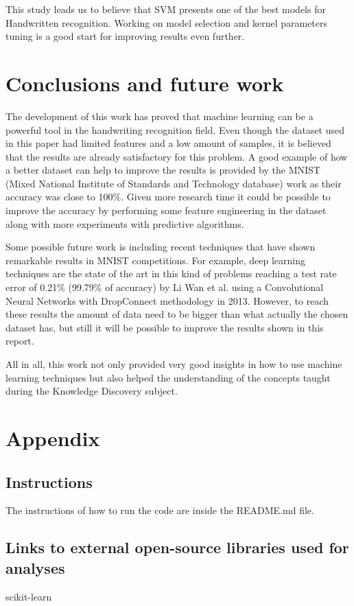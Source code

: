 \documentclass[letterpaper,10pt]{article}
\theoremstyle{mytheor}
\begin{document}
This study leads us to believe that SVM presents one of the best models for Handwritten recognition. Working on model selection and kernel parameters tuning is a good start for improving results even further.

\section{Conclusions and future work}

The development of this work has proved that machine learning can be a powerful tool in the handwriting recognition field. Even though the dataset used in this paper had limited features and a low amount of samples, it is believed that the results are already satisfactory for this problem. A good example of how a better dataset can help to improve the results is provided by the MNIST (Mixed National Institute of Standards and Technology database) work as their accuracy was close to 100\%. Given more research time it could be possible to improve the accuracy by performing some feature engineering in the dataset along with more experiments with predictive algorithms. 

Some possible future work is including recent techniques that have shown remarkable results in MNIST competitions. For example, deep learning techniques are the state of the art in this kind of problems reaching a test rate error of 0.21\% (99.79\% of accuracy) by Li Wan et al. using a Convolutional Neural Networks with DropConnect methodology in 2013. However, to reach these results the amount of data need to be bigger than what actually the chosen dataset has, but still it will be possible to improve the results shown in this report.

All in all, this work not only provided very good insights in how to use machine learning techniques but also helped the understanding of the concepts taught during the Knowledge Discovery subject.


\nocite{wiki:fscore}
\nocite{wiki:pandr}
\nocite{wiki:stat} 
\nocite{wiki:curse}



\section{Appendix}

\subsection{Instructions}
The instructions of how to run the code are inside the README.md file.

\subsection{Links to external open-source libraries used for analyses}
scikit-learn
\end{document}
